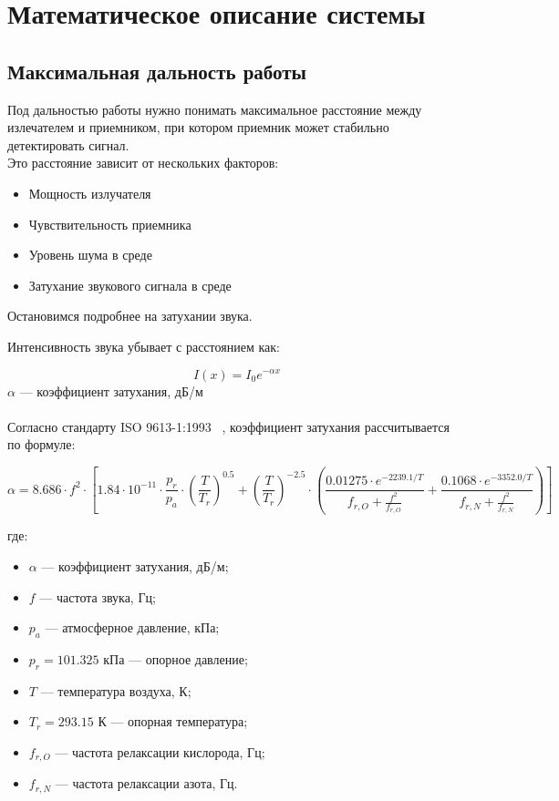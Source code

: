 \documentclass[a4paper,11pt]{article} %
\begin{document}
\section{Математическое описание системы}
\subsection{Максимальная дальность работы}
Под дальностью работы нужно понимать максимальное расстояние между излечателем и приемником, 
при котором приемник может стабильно детектировать сигнал. \\
Это расстояние зависит от нескольких факторов:


\begin{itemize}
  \item Мощность излучателя
  \item Чувствительность приемника
  \item Уровень шума в среде 
  \item Затухание звукового сигнала в среде
\end{itemize}
Остановимся подробнее на затухании звука.

Интенсивность звука убывает с расстоянием как:

\begin{equation}
 I(x) = I_0e^{-\alpha x}
\end{equation}
$\alpha$ — коэффициент затухания, дБ/м \\
\\
Согласно стандарту ISO 9613-1:1993~\cite{iso9613} , коэффициент затухания рассчитывается по формуле:

\begin{equation}\label{iso}
\alpha = 8.686 \cdot f^{2} \cdot \left[ 1.84 \cdot 10^{-11} \cdot \frac{p_r}{p_a} \cdot \left(\frac{T}{T_r}\right)^{0.5} + \left(\frac{T}{T_r}\right)^{-2.5} \cdot \left( \frac{0.01275 \cdot e^{-2239.1/T}}{f_{r,O} + \frac{f^{2}}{f_{r,O}}} + \frac{0.1068 \cdot e^{-3352.0/T}}{f_{r,N} + \frac{f^{2}}{f_{r,N}}} \right) \right]
\end{equation}

где:
\begin{itemize}
\item $\alpha$ — коэффициент затухания, дБ/м;
\item $f$ — частота звука, Гц;
\item $p_a$ — атмосферное давление, кПа;
\item $p_r = 101.325$ кПа — опорное давление;
\item $T$ — температура воздуха, К;
\item $T_r = 293.15$ К — опорная температура;
\item $f_{r,O}$ — частота релаксации кислорода, Гц;
\item $f_{r,N}$ — частота релаксации азота, Гц.
\end{itemize}
\end{document}
